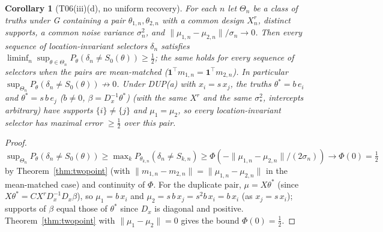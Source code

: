 \documentclass[11pt]{article}
\newtheorem{corollary}[theorem]{Corollary}
\theoremstyle{remark}
\newcommand{\one}{\mathbf 1}
\begin{document}
\begin{corollary}[T06(iii)(d), no uniform recovery]\label{cor:uniform}
For each $n$ let $\Theta_n$ be a class of truths under G containing a pair $\theta_{1,n},\theta_{2,n}$ with a common design $X^r_n$, distinct supports, a common noise variance $\sigma_n^2$, and $\|\mu_{1,n}-\mu_{2,n}\|/\sigma_n\to0$. Then every sequence of location-invariant selectors $\delta_n$ satisfies $\liminf_n\sup_{\theta\in\Theta_n}P_\theta(\delta_n\ne S_0(\theta))\ge\tfrac12$; the same holds for every sequence of selectors when the pairs are mean-matched ($\one^\top m_{1,n}=\one^\top m_{2,n}$). In particular $\sup_{\Theta_n}P_\theta(\delta_n\ne S_0(\theta))\not\to0$. Under DUP(a) with $x_i=s\,x_j$, the truths $\theta^*=b\,e_i$ and $\theta^*=s\,b\,e_j$ ($b\ne0$, $\beta=D_x^{-1}\theta^*$) (with the same $X^r$ and the same $\sigma_*^2$, intercepts arbitrary) have supports $\{i\}\ne\{j\}$ and $\mu_1=\mu_2$, so every location-invariant selector has maximal error $\ge\tfrac12$ over this pair.
\end{corollary}
\begin{proof}
$\sup_{\Theta_n}P_\theta(\delta_n\ne S_0(\theta))\ge\max_kP_{\theta_{k,n}}(\delta_n\ne S_{k,n})\ge\Phi(-\|\mu_{1,n}-\mu_{2,n}\|/(2\sigma_n))\to\Phi(0)=\tfrac12$ by Theorem~\ref{thm:twopoint} (with $\|m_{1,n}-m_{2,n}\|=\|\mu_{1,n}-\mu_{2,n}\|$ in the mean-matched case) and continuity of $\Phi$. For the duplicate pair, $\mu=X\theta^*$ (since $X\theta^*=CX^rD_x^{-1}D_x\beta$), so $\mu_1=b\,x_i$ and $\mu_2=s\,b\,x_j=s^2b\,x_i=b\,x_i$ (as $x_j=s\,x_i$); supports of $\beta$ equal those of $\theta^*$ since $D_x$ is diagonal and positive. Theorem~\ref{thm:twopoint} with $\|\mu_1-\mu_2\|=0$ gives the bound $\Phi(0)=\tfrac12$.
\end{proof}
\end{document}
